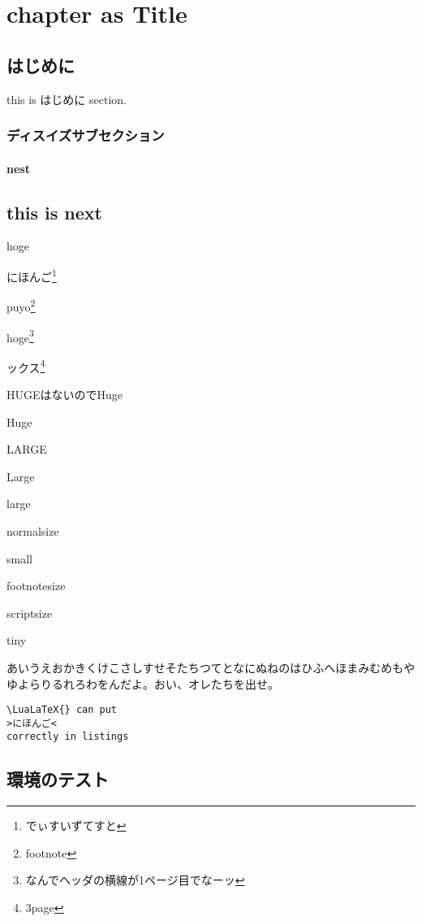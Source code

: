 \documentclass{word}
\author{WORD太郎}
\subtitle{subtitleだぴょん}
\begin{document}
\chapter{chapter as Title}

\section{はじめに}
this is はじめに section.

\subsection{ディスイズサブセクション}

\subsubsection{nest}

\section{this is next}

hoge

にほんご\footnote{でぃすいずてすと}

puyo\footnote{footnote}

hoge\footnote{なんでヘッダの横線が1ページ目でなーッ}

ックス\footnote{3page}

{\Huge HUGEはないのでHuge}

{\Huge Huge}

{\LARGE LARGE}

{\Large Large}

{\large large}

{\normalsize normalsize}

{\small small}

{\footnotesize footnotesize}

{\scriptsize scriptsize}

{\tiny tiny}

あいうえおかきくけこさしすせそたちつてとなにぬねのはひふへほまみむめもやゆよらりるれろわをんだよ。おい、オレたちを出せ。

\lstset{language=TeX,numbers=left,title=fuck}
\begin{lstlisting}
\LuaLaTeX{} can put
>にほんご<
correctly in listings
\end{lstlisting}

% 

\section{環境のテスト}
\end{document}

